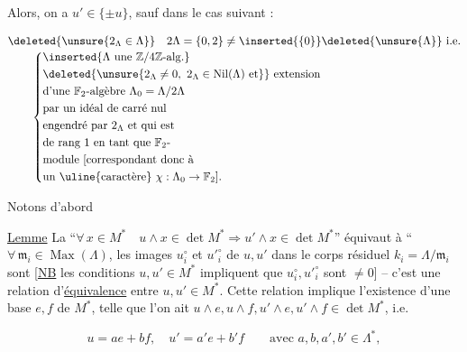 
Alors, on a $u'\in\{\pm u\}$, sauf dans le cas suivant :

\[
\begin{aligned}
&\deleted{\unsure{2_\Lambda\in\Lambda}}\quad 2\Lambda=\{0,2\}\ne\inserted{\{0\}}\deleted{\unsure{\Lambda}}\ \text{i.e.}\\[-2pt]
&\qquad\left\{\begin{aligned}
&\inserted{\Lambda\ \text{une }\mathbb Z/4\mathbb Z\text{-alg.}}\\
&\deleted{\unsure{2_\Lambda\ne0,\ 2_\Lambda\in\operatorname{Nil}(\Lambda)\ \text{et}}}\ \text{extension}\\
&\text{d'une }\mathbb F_2\text{-algèbre }\Lambda_0=\Lambda/2\Lambda\\
&\text{par un idéal de carré nul}\\
&\text{engendré par }2_\Lambda\ \text{et qui est}\\
&\text{de rang }1\ \text{en tant que }\mathbb F_2\text{-}\\
&\text{module [correspondant donc à}\\
&\text{un \uline{caractère} }\chi:\Lambda_0\to\mathbb F_2].
\end{aligned}\right.
\end{aligned}
\]

Notons d'abord

\uline{Lemme} La  ``$\forall\,x\in M^*\quad u\wedge x\in\det M^*\Longrightarrow u'\wedge x\in\det M^*$'' équivaut à ``$\forall\,\mathfrak m_i\in\operatorname{Max}(\Lambda)$,  les images $u_i^\circ$ et $ {u'}_i^\circ$ de $u,u'$ dans le corps résiduel $k_i=\Lambda/\mathfrak m_i$ sont  [\uline{NB} les conditions $u,u'\in M^*$  impliquent que $u_i^\circ,{u'}_i^\circ$ sont $\ne0$] -- c'est  une relation d'\uline{équivalence} entre $u,u'\in M^*$. Cette relation implique l'existence d'une base $e,f$ de $M^*$, telle que l'on ait $u\wedge e,u\wedge f,u'\wedge e,u'\wedge f\in\det M^*$, i.e.

\[
u=ae+bf,\quad u'=a'e+b'f\qquad\text{avec }a,b,a',b'\in\Lambda^*,
\]

